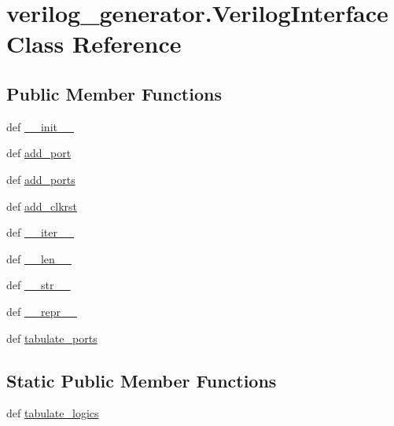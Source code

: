 \hypertarget{classverilog__generator_1_1VerilogInterface}{\section{verilog\-\_\-generator.\-Verilog\-Interface Class Reference}
\label{classverilog__generator_1_1VerilogInterface}
}
\subsection*{Public Member Functions}
\begin{DoxyCompactItemize}
\item 
def \hyperlink{classverilog__generator_1_1VerilogInterface_afec521101bc96b24509c3da885dbe6d2}{\-\_\-\-\_\-init\-\_\-\-\_\-}
\item 
def \hyperlink{classverilog__generator_1_1VerilogInterface_ad8989e91521cee4a99187bacc5ecdf8d}{add\-\_\-port}
\item 
def \hyperlink{classverilog__generator_1_1VerilogInterface_a9ef2832a883e35b29e075dda52f1e999}{add\-\_\-ports}
\item 
def \hyperlink{classverilog__generator_1_1VerilogInterface_a0e6f19b927b07a6f7a8d920912c12367}{add\-\_\-clkrst}
\item 
def \hyperlink{classverilog__generator_1_1VerilogInterface_a6c6c6fffc35a157d28d4837c2a35b4c0}{\-\_\-\-\_\-iter\-\_\-\-\_\-}
\item 
def \hyperlink{classverilog__generator_1_1VerilogInterface_af8cd8dcedcb63d370443c6aeb982a56f}{\-\_\-\-\_\-len\-\_\-\-\_\-}
\item 
def \hyperlink{classverilog__generator_1_1VerilogInterface_a1da1b0be5eff7ebdff98b56bd022a6e2}{\-\_\-\-\_\-str\-\_\-\-\_\-}
\item 
def \hyperlink{classverilog__generator_1_1VerilogInterface_ac1d0383d88782b4c1239d670c02c22ce}{\-\_\-\-\_\-repr\-\_\-\-\_\-}
\item 
def \hyperlink{classverilog__generator_1_1VerilogInterface_acd55bbb4e88b34ffac2d47fd838d1a8d}{tabulate\-\_\-ports}
\end{DoxyCompactItemize}
\subsection*{Static Public Member Functions}
\begin{DoxyCompactItemize}
\item 
def \hyperlink{classverilog__generator_1_1VerilogInterface_acd51229da1a1e00603beed3963fad0fd}{tabulate\-\_\-logics}
\end{DoxyCompactItemize}
